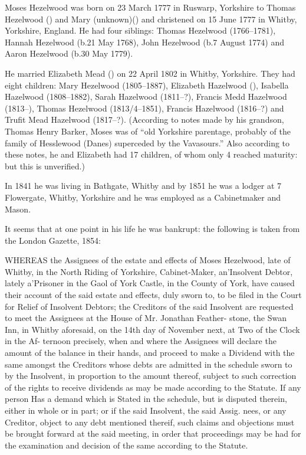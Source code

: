 
Moses Hezelwood was born on 23 March 1777 in 	Ruswarp, Yorkshire to Thomas Hezelwood () and Mary (unknown)() and christened on 15 June 1777 in	Whitby, Yorkshire, England.\cite{MHezelwoodBirth} He had four siblings: Thomas Hezelwood (1766--1781), Hannah Hezelwood (b.21 May 1768), John Hezelwood (b.7 August 1774) and Aaron Hezelwood (b.30 May 1779).

He married Elizabeth Mead () on 22 April 1802 in	Whitby, Yorkshire.\cite{MHezelwoodMarriage}  They had eight children: Mary Hezelwood (1805--1887), Elizabeth Hazelwood (), Isabella Hazelwood (1808--1882), Sarah Hazelwood (1811--?), Francis Medd Hazelwood (1813--), Thomas Hezelwood (1813/4--1851),
Francis Hazelwood (1816--?) and Trufit Mead Hazelwood (1817--?). (According to notes made by his grandson, Thomas Henry Barker, Moses  was of ``old Yorkshire parentage, probably of the family of Hesslewood (Danes) superceded by the Vavasours.'' Also according to these notes, he and Elizabeth had 17 children, of whom only 4 reached maturity: but this is unverified.)

In 1841 he was living in Bathgate, Whitby \cite{MHezelwood1841} and by 1851 he was a lodger at 7 Flowergate,	Whitby, Yorkshire and he was employed as a Cabinetmaker and Mason.\cite{MHezelwood1851}

It seems that at one point in his life he was bankrupt: the following is taken from the London Gazette, 1854:

WHEREAS the Assignees of the estate and effects of Moses Hezelwood, late of Whitby, in the North Riding of Yorkshire, Cabinet-Maker, an'Insolvent Debtor, lately a'Prisoner in the Gaol of York Castle, in the County of York, have caused their account of the said estate and effects, duly sworn to, to be filed in the Court for Relief of Insolvent Debtors; the Creditors of the said Insolvent are requested to meet the Assignees at the House of Mr. Jonathan Feather- stone, the Swan Inn, in Whitby aforesaid, on the 14th day of November next, at Two of the Clock in the Af- ternoon precisely, when and where the Assignees will declare the amount of the balance in their hands, and proceed to make a Dividend with the same amongst the Creditors whose debts are admitted in the schedule sworn to by the Insolvent, in proportion to the amount thereof, subject to such correction of the rights to receive dividends as may be made according to the Statute. If any person Has a demand which is Stated in the schedule, but is disputed therein, either in whole or in part; or if the said Insolvent, the said Assig. nees, or any Creditor, object to any debt mentioned thereif, such claims and objections must be brought forward at the said meeting, in order that proceedings may be had for the examination and decision of the same according to the Statute.

